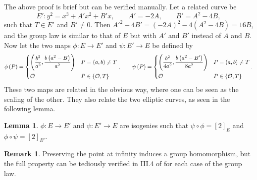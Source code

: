 \documentclass{article}
\newcommand{\rb}[1]{\left( #1 \right)}
\renewcommand{\sb}[1]{\left[ #1 \right]}
\newcommand{\cb}[1]{\left\{ #1 \right\}}
\theoremstyle{definition}
\newtheorem*{remark}{Remark}
\newtheorem{lemma}[proposition]{Lemma}
\begin{document}
The above proof is brief but can be verified manually. Let a related curve be
$$ E' : y^2 = x^3 + A'x^2 + B'x, \qquad A' = -2A, \qquad B' = A^2 - 4B, $$
such that $ T \in E' $ and $ B' \ne 0 $. Then $ A'^2 - 4B' = \rb{-2A}^2 - 4\rb{A^2 - 4B} = 16B $, and the group law is similar to that of $ E $ but with $ A' $ and $ B' $ instead of $ A $ and $ B $. Now let the two maps $ \phi : E \to E' $ and $ \psi : E' \to E $ be defined by
$$ \phi\rb{P} = \begin{dcases} \rb{\dfrac{b^2}{a^2}, \dfrac{b\rb{a^2 - B}}{a^2}} & P = \rb{a, b} \ne T \\ \mathcal{O} & P \in \cb{\mathcal{O}, T} \end{dcases}, \qquad \psi\rb{P} = \begin{dcases} \rb{\dfrac{b^2}{4a^2}, \dfrac{b\rb{a^2 - B'}}{8a^2}} & P = \rb{a, b} \ne T \\ \mathcal{O} & P \in \cb{\mathcal{O}, T} \end{dcases}. $$
These two maps are related in the obvious way, where one can be seen as the scaling of the other. They also relate the two elliptic curves, as seen in the following lemma.

\begin{lemma}
$ \phi : E \to E' $ and $ \psi : E' \to E $ are isogenies such that $ \psi \circ \phi = \sb{2}_E $ and $ \phi \circ \psi = \sb{2}_{E'} $.
\end{lemma}

\begin{remark}
Preserving the point at infinity induces a group homomorphism, but the full property can be tediously verified in III.4 of \cite{utm} for each case of the group law.
\end{remark}
\end{document}
